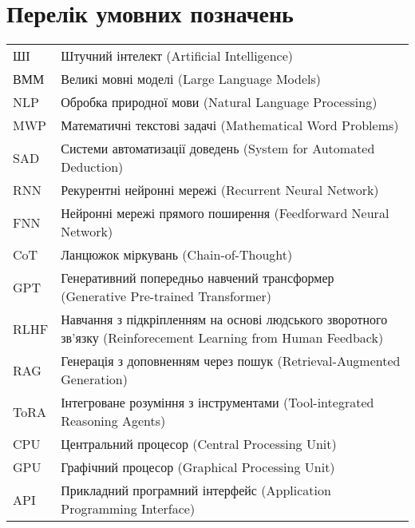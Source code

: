 \chapter*{Перелік умовних позначень}

\begin{longtable}{p{3cm}p{11cm}}
    ШІ & Штучний інтелект (Artificial Intelligence) \\
    ВММ & Великі мовні моделі (Large Language Models) \\
    NLP & Обробка природної мови (Natural Language Processing) \\
    MWP & Математичні текстові задачі (Mathematical Word Problems) \\
    SAD & Системи автоматизації доведень (System for Automated Deduction) \\
    RNN & Рекурентні нейронні мережі (Recurrent Neural Network) \\
    FNN & Нейронні мережі прямого поширення (Feedforward Neural Network) \\
    CoT & Ланцюжок міркувань (Chain-of-Thought) \\
    GPT & Генеративний попередньо навчений трансформер (Generative Pre-trained Transformer) \\
    RLHF & Навчання з підкріпленням на основі людського зворотного зв'язку (Reinforecement Learning from Human Feedback) \\
    RAG & Генерація з доповненням через пошук (Retrieval-Augmented Generation) \\
    ToRA & Інтегроване розуміння з інструментами (Tool-integrated Reasoning Agents) \\
    CPU & Центральний процесор (Central Processing Unit) \\
    GPU & Графічний процесор (Graphical Processing Unit) \\
    API & Прикладний програмний інтерфейс (Application Programming Interface)
\end{longtable}

\newpage
